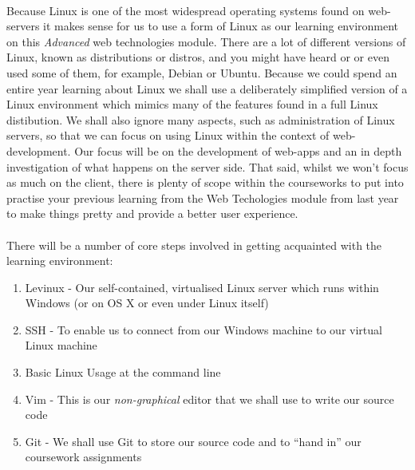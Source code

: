 \documentclass[12pt, a4paper, twoside]{book}
\begin{document}
\paragraph{} Because Linux is one of the most widespread operating systems found on web-servers it makes sense for us to use a form of Linux as our learning environment on this \emph{Advanced} web technologies module. There are a lot of different versions of Linux, known as distributions or distros, and you might have heard or or even used some of them, for example, Debian or Ubuntu. Because we could spend an entire year learning about Linux we shall use a deliberately simplified version of a Linux environment which mimics many of the features found in a full Linux distibution. We shall also ignore many aspects, such as administration of Linux servers, so that we can focus on using Linux within the context of web-development. Our focus will be on the development of web-apps and an in depth investigation of what happens on the server side. That said, whilst we won't focus as much on the client, there is plenty of scope within the courseworks to put into practise your previous learning from the Web Techologies module from last year to make things pretty and provide a better user experience.

\paragraph{} There will be a number of core steps involved in getting acquainted with the learning environment:

\begin{enumerate}
\item Levinux - Our self-contained, virtualised Linux server which runs within Windows (or on OS X or even under Linux itself)
\item SSH - To enable us to connect from our Windows machine to our virtual Linux machine
\item Basic Linux Usage at the command line
\item Vim - This is our \emph{non-graphical} editor that we shall use to write our source code
\item Git - We shall use Git to store our source code and to ``hand in'' our coursework assignments
\end{enumerate}
\end{document}
